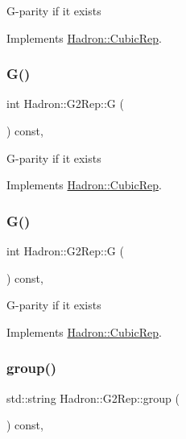 G-\/parity if it exists 

Implements \mbox{\hyperlink{structHadron_1_1CubicRep_a52104e43266d1614c00bbd1c3b395458}{Hadron\+::\+Cubic\+Rep}}.

\mbox{\label{structHadron_1_1G2Rep_ad27dff08ddb0fa10f2dc503f47cdd766}} 
\subsubsection{\texorpdfstring{G()}{G()}\hspace{0.1cm}{\footnotesize\ttfamily [2/3]}}
{\footnotesize\ttfamily int Hadron\+::\+G2\+Rep\+::G (\begin{DoxyParamCaption}{ }\end{DoxyParamCaption}) const\hspace{0.3cm}{\ttfamily [inline]}, {\ttfamily [virtual]}}

G-\/parity if it exists 

Implements \mbox{\hyperlink{structHadron_1_1CubicRep_a52104e43266d1614c00bbd1c3b395458}{Hadron\+::\+Cubic\+Rep}}.

\mbox{\label{structHadron_1_1G2Rep_ad27dff08ddb0fa10f2dc503f47cdd766}} 
\subsubsection{\texorpdfstring{G()}{G()}\hspace{0.1cm}{\footnotesize\ttfamily [3/3]}}
{\footnotesize\ttfamily int Hadron\+::\+G2\+Rep\+::G (\begin{DoxyParamCaption}{ }\end{DoxyParamCaption}) const\hspace{0.3cm}{\ttfamily [inline]}, {\ttfamily [virtual]}}

G-\/parity if it exists 

Implements \mbox{\hyperlink{structHadron_1_1CubicRep_a52104e43266d1614c00bbd1c3b395458}{Hadron\+::\+Cubic\+Rep}}.

\mbox{\label{structHadron_1_1G2Rep_a6314a9f6f255a4916e007936876f6135}} 
\subsubsection{\texorpdfstring{group()}{group()}\hspace{0.1cm}{\footnotesize\ttfamily [1/3]}}
{\footnotesize\ttfamily std\+::string Hadron\+::\+G2\+Rep\+::group (\begin{DoxyParamCaption}{ }\end{DoxyParamCaption}) const\hspace{0.3cm}{\ttfamily [inline]}, {\ttfamily [virtual]}}

